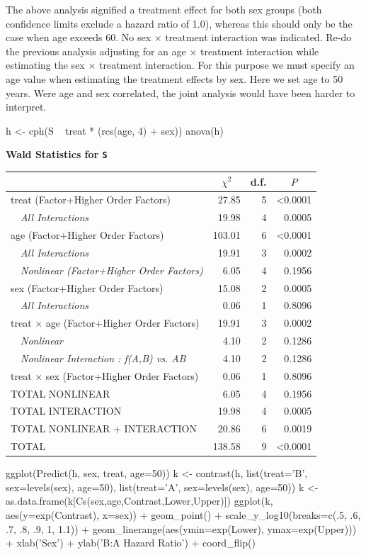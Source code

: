The above analysis signified a treatment effect for both sex groups (both confidence limits exclude a hazard ratio of 1.0), whereas this should only be the case when age exceeds 60.  No sex $\times$ treatment interaction was indicated.
Re-do the previous analysis adjusting for an age $\times$ treatment interaction while estimating the sex $\times$ treatment interaction.  For this purpose we must specify an age value when estimating the treatment effects by sex.  Here we set age to 50 years.  Were age and sex correlated, the joint analysis would have been harder to interpret.
\begin{Sinput}
h <- cph(S ~ treat * (rcs(age, 4) + sex))
anova(h)
\end{Sinput}
\textbf{\Needspace{2in}
Wald Statistics for \texttt{\smaller S}}\begin{center}
\begin{tabular}{lrrr}
\hline\hline
\multicolumn{1}{l}{}&\multicolumn{1}{c}{$\chi^{2}$}&\multicolumn{1}{c}{d.f.}&\multicolumn{1}{c}{$P$}\tabularnewline
\hline
treat  (Factor+Higher Order Factors)& 27.85&5&\textless 0.0001\tabularnewline
~~\emph{All Interactions}& 19.98&4&0.0005\tabularnewline
age  (Factor+Higher Order Factors)&103.01&6&\textless 0.0001\tabularnewline
~~\emph{All Interactions}& 19.91&3&0.0002\tabularnewline
~~\emph{Nonlinear (Factor+Higher Order Factors)}&  6.05&4&0.1956\tabularnewline
sex  (Factor+Higher Order Factors)& 15.08&2&0.0005\tabularnewline
~~\emph{All Interactions}&  0.06&1&0.8096\tabularnewline
treat $\times$ age  (Factor+Higher Order Factors)& 19.91&3&0.0002\tabularnewline
~~\emph{Nonlinear}&  4.10&2&0.1286\tabularnewline
~~\emph{Nonlinear Interaction : f(A,B) vs. AB}&  4.10&2&0.1286\tabularnewline
treat $\times$ sex  (Factor+Higher Order Factors)&  0.06&1&0.8096\tabularnewline
TOTAL NONLINEAR&  6.05&4&0.1956\tabularnewline
TOTAL INTERACTION& 19.98&4&0.0005\tabularnewline
TOTAL NONLINEAR + INTERACTION& 20.86&6&0.0019\tabularnewline
TOTAL&138.58&9&\textless 0.0001\tabularnewline
\hline
\end{tabular}\end{center}
\begin{Sinput}
ggplot(Predict(h, sex, treat, age=50))
k <- contrast(h, list(treat='B', sex=levels(sex), age=50),
                 list(treat='A', sex=levels(sex), age=50))
k <- as.data.frame(k[Cs(sex,age,Contrast,Lower,Upper)])
ggplot(k, aes(y=exp(Contrast), x=sex)) + geom_point() +
  scale_y_log10(breaks=c(.5, .6, .7, .8, .9, 1, 1.1)) +
  geom_linerange(aes(ymin=exp(Lower), ymax=exp(Upper))) + 
  xlab('Sex') + ylab('B:A Hazard Ratio') + coord_flip()
\end{Sinput}


